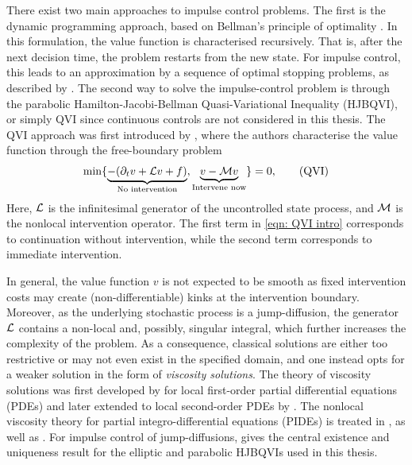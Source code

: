 There exist two main approaches to impulse control problems. The first is the dynamic programming approach, based on Bellman's principle of optimality \cite{bellman1957dynamic}. In this formulation, the value function is characterised recursively. That is, after the next decision time, the problem restarts from the new state. For impulse control, this leads to an approximation by a sequence of optimal stopping problems, as described by \textcite{oksendal2007applied}. The second way to solve the impulse-control problem is through the parabolic Hamilton-Jacobi-Bellman Quasi-Variational Inequality (HJBQVI), or simply QVI since continuous controls are not considered in this thesis. The QVI approach was first introduced by \textcite{bensoussan1975nouvelles}, where the authors characterise the value function through the free-boundary problem
\begin{equation}
    \min\{ \underbrace{- (\partial_t v + \mathcal{L} v + f)}_{\text{No intervention}}, \underbrace{v - \mathcal{M} v}_{\text{Intervene now}}\} = 0, 
    \tag{QVI}
    \label{eqn: QVI intro}
\end{equation}
Here, $\mathcal{L}$ is the infinitesimal generator of the uncontrolled state process, and $\mathcal{M}$ is the nonlocal intervention operator. The first term in \eqref{eqn: QVI intro} corresponds to continuation without intervention, while the second term corresponds to immediate intervention. 

In general, the value function $v$ is not expected to be smooth as fixed intervention costs may create (non-differentiable) kinks at the intervention boundary. Moreover, as the underlying stochastic process is a jump-diffusion, the generator $\mathcal{L}$ contains a non-local and, possibly, singular integral, which further increases the complexity of the problem. As a consequence, classical solutions are either too restrictive or may not even exist in the specified domain, and one instead opts for a weaker solution in the form of \textit{viscosity solutions}. The theory of viscosity solutions was first developed by \textcite{crandall1983viscosity} for local first-order partial differential equations (PDEs) and later extended to local second-order PDEs by \textcite{crandall1992user}. The nonlocal viscosity theory for partial integro-differential equations (PIDEs) is treated in \textcite{barles2008second}, as well as \textcite{jakobsen2006maximum}. For impulse control of jump-diffusions, \textcite{seydel2010generalexistenceuniquenessviscosity} gives the central existence and uniqueness result for the elliptic and parabolic HJBQVIs used in this thesis. 

